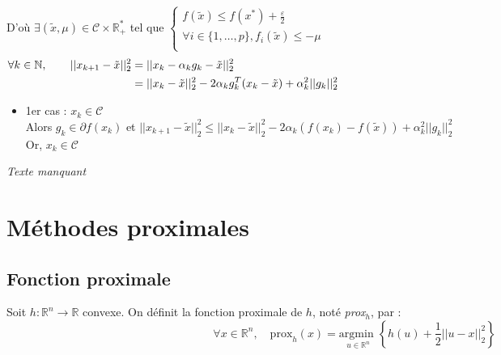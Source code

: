 \documentclass[12pt,a4paper]{article}
\begin{document}
D'où $\exists (\tilde{x}, \mu) \in \mathcal{C} \times \mathbb{R}_+^*$ tel que
$
\begin{cases}
    f(\tilde{x}) \leq f(x^*) + \frac{\varepsilon}{2}\\
    \forall i \in \{1, \dots, p\}, f_i(\tilde{x}) \leq - \mu\\
\end{cases}
$\\

\begin{align*}
    \forall k \in \mathbb{N}, \qquad ||x_{k+1} - \tilde{x}||_2^2 &= ||x_k - \alpha_k g_k - \tilde{x}||_2^2 \hspace{14.5cm}\\
    &= ||x_k - \tilde{x}||_2^2 - 2 \alpha_k g_k^T (x_k - \tilde{x}) + \alpha_k^2 ||g_k||_2^2\\
\end{align*}

\begin{itemize}
    \item 1er cas : $x_k \in \mathcal{C}$\\
    Alors $g_k \in \partial f(x_k)$ et $||x_{k+1} - \tilde{x}||_2^2 \leq ||x_k - \tilde{x}||_2^2 - 2 \alpha_k (f(x_k) - f(\tilde{x})) + \alpha_k^2 ||g_k||_2^2$\\
    Or, $x_k \in \mathcal{C}$ 
\end{itemize}

\textit{Texte manquant}\\




\section{Méthodes proximales}

\subsection{Fonction proximale}

Soit $h : \mathbb{R}^n \rightarrow \mathbb{R}$ convexe. On définit la fonction proximale de $h$, noté \textit{prox}$_h$, par :\\
\begin{equation}
    \forall x \in \mathbb{R}^n, \quad \text{prox}_h(x) = \underset{u \in \mathbb{R}^n}{\text{argmin }} \left\{ h(u) + \frac{1}{2} ||u - x||_2^2 \right\}
    \label{eq:prox}
\end{equation}
\end{document}
